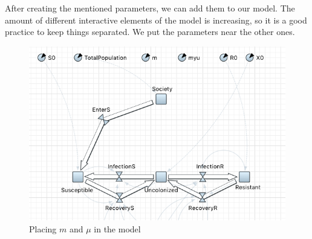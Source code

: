 After creating the mentioned parameters, we can add them to our model. The amount of different interactive elements of the model is increasing, so it is a good practice to keep things separated. We put the parameters near the other ones.

\begin{figure}[H]
  \centering
  \includegraphics[height=0.5\textwidth]{img/screens/society/society5}
  \caption{Placing $m$ and $\mu$ in the model}
\end{figure}
